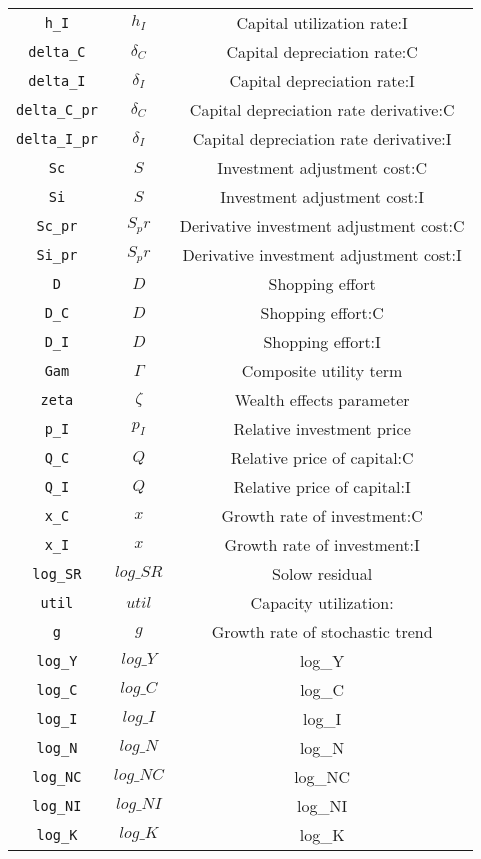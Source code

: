 \begin{center}
\begin{longtable}{ccc}
\texttt{h\_I} & ${h_I}$ & Capital utilization rate:I\\
\texttt{delta\_C} & ${\delta_C}$ & Capital depreciation rate:C\\
\texttt{delta\_I} & ${\delta_I}$ & Capital depreciation rate:I\\
\texttt{delta\_C\_pr} & ${\delta_C}$ & Capital depreciation rate derivative:C\\
\texttt{delta\_I\_pr} & ${\delta_I}$ & Capital depreciation rate derivative:I\\
\texttt{Sc} & $S$ & Investment adjustment cost:C\\
\texttt{Si} & $S$ & Investment adjustment cost:I\\
\texttt{Sc\_pr} & $S_pr$ & Derivative investment adjustment cost:C\\
\texttt{Si\_pr} & $S_pr$ & Derivative investment adjustment cost:I\\
\texttt{D} & ${D}$ & Shopping effort\\
\texttt{D\_C} & ${D}$ & Shopping effort:C\\
\texttt{D\_I} & ${D}$ & Shopping effort:I\\
\texttt{Gam} & ${\Gamma}$ & Composite utility term\\
\texttt{zeta} & ${\zeta}$ & Wealth effects parameter\\
\texttt{p\_I} & ${p_I}$ & Relative investment price\\
\texttt{Q\_C} & ${Q}$ & Relative price of capital:C\\
\texttt{Q\_I} & ${Q}$ & Relative price of capital:I\\
\texttt{x\_C} & ${x}$ & Growth rate of investment:C\\
\texttt{x\_I} & ${x}$ & Growth rate of investment:I\\
\texttt{log\_SR} & $log\_SR$ & Solow residual\\
\texttt{util} & ${util}$ & Capacity utilization:\\
\texttt{g} & ${g}$ & Growth rate of stochastic trend\\
\texttt{log\_Y} & $log\_Y$ & log\_Y\\
\texttt{log\_C} & $log\_C$ & log\_C\\
\texttt{log\_I} & $log\_I$ & log\_I\\
\texttt{log\_N} & $log\_N$ & log\_N\\
\texttt{log\_NC} & $log\_NC$ & log\_NC\\
\texttt{log\_NI} & $log\_NI$ & log\_NI\\
\texttt{log\_K} & $log\_K$ & log\_K\\

\end{longtable}
\end{center}
